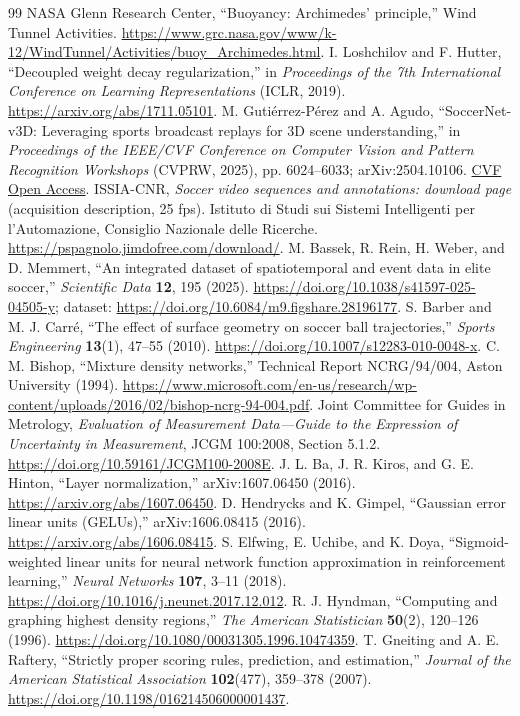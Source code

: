 \begin{thebibliography}{99}
 NASA Glenn Research Center, “Buoyancy: Archimedes' principle,” Wind Tunnel Activities. \url{https://www.grc.nasa.gov/www/k-12/WindTunnel/Activities/buoy_Archimedes.html}.
 I. Loshchilov and F. Hutter, “Decoupled weight decay regularization,” in \emph{Proceedings of the 7th International Conference on Learning Representations} (ICLR, 2019). \url{https://arxiv.org/abs/1711.05101}.
 M. Guti\'errez-P\'erez and A. Agudo, “SoccerNet-v3D: Leveraging sports broadcast replays for 3D scene understanding,” in \emph{Proceedings of the IEEE/CVF Conference on Computer Vision and Pattern Recognition Workshops} (CVPRW, 2025), pp. 6024--6033; arXiv:2504.10106. \href{https://openaccess.thecvf.com/content/CVPR2025W/CVSPORTS/html/Gutierrez-Perez_SoccerNet-v3D_Leveraging_Sports_Broadcast_Replays_for_3D_Scene_Understanding_CVPRW_2025_paper.html}{CVF Open Access}.
 ISSIA-CNR, \emph{Soccer video sequences and annotations: download page} (acquisition description, 25 fps). Istituto di Studi sui Sistemi Intelligenti per l'Automazione, Consiglio Nazionale delle Ricerche. \url{https://pspagnolo.jimdofree.com/download/}.
 M. Bassek, R. Rein, H. Weber, and D. Memmert, “An integrated dataset of spatiotemporal and event data in elite soccer,” \emph{Scientific Data} \textbf{12}, 195 (2025). \url{https://doi.org/10.1038/s41597-025-04505-y}; dataset: \url{https://doi.org/10.6084/m9.figshare.28196177}.
 S. Barber and M. J. Carr\'e, “The effect of surface geometry on soccer ball trajectories,” \emph{Sports Engineering} \textbf{13}(1), 47--55 (2010). \url{https://doi.org/10.1007/s12283-010-0048-x}.
 C. M. Bishop, “Mixture density networks,” Technical Report NCRG/94/004, Aston University (1994). \url{https://www.microsoft.com/en-us/research/wp-content/uploads/2016/02/bishop-ncrg-94-004.pdf}.
 Joint Committee for Guides in Metrology, \emph{Evaluation of Measurement Data---Guide to the Expression of Uncertainty in Measurement}, JCGM 100:2008, Section 5.1.2. \url{https://doi.org/10.59161/JCGM100-2008E}.
 J. L. Ba, J. R. Kiros, and G. E. Hinton, “Layer normalization,” arXiv:1607.06450 (2016). \url{https://arxiv.org/abs/1607.06450}.
 D. Hendrycks and K. Gimpel, “Gaussian error linear units (GELUs),” arXiv:1606.08415 (2016). \url{https://arxiv.org/abs/1606.08415}.
 S. Elfwing, E. Uchibe, and K. Doya, “Sigmoid-weighted linear units for neural network function approximation in reinforcement learning,” \emph{Neural Networks} \textbf{107}, 3--11 (2018). \url{https://doi.org/10.1016/j.neunet.2017.12.012}.
 R. J. Hyndman, “Computing and graphing highest density regions,” \emph{The American Statistician} \textbf{50}(2), 120--126 (1996). \url{https://doi.org/10.1080/00031305.1996.10474359}.
 T. Gneiting and A. E. Raftery, “Strictly proper scoring rules, prediction, and estimation,” \emph{Journal of the American Statistical Association} \textbf{102}(477), 359--378 (2007). \url{https://doi.org/10.1198/016214506000001437}.


\end{thebibliography}
